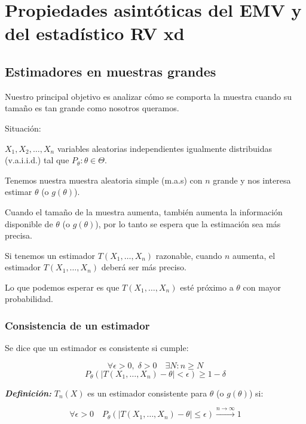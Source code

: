 \section{Propiedades asintóticas del EMV y del estadístico RV xd}


\subsection{Estimadores en muestras grandes}

Nuestro principal objetivo es analizar cómo se comporta la muestra cuando su tamaño es tan grande como nosotros queramos.
\setlength{\parskip}{1em}   %

Situación:
\setlength{\parskip}{0em}   %

$ X_1, X_2, \dots, X_n $ variables aleatorias independientes igualmente distribuidas (v.a.i.i.d.) tal que $ P_\theta:\theta  \in  \Theta$.

Tenemos nuestra muestra aleatoria simple (m.a.s) con $ n $ grande y nos interesa estimar $ \theta $ (o $ g(\theta) $).

\setlength{\parskip}{1em}   %
Cuando el tamaño de la muestra aumenta, también aumenta la información disponible de $ \theta $ (o $ g(\theta) $), por lo tanto se espera que la estimación sea más precisa.

Si tenemos un estimador $ T(X_1, \dots, X_n) $ razonable, cuando $ n $ aumenta, el estimador $ T(X_1, \dots, X_n) $ deberá ser más preciso.

\setlength{\parskip}{0em}   %
Lo que podemos esperar es que $ T(X_1, \dots, X_n) $ esté próximo a $ \theta $ con mayor probabilidad.

\subsubsection{Consistencia de un estimador}

Se dice que un estimador es consistente si cumple:
\setlength{\parskip}{1em}

\[\forall \epsilon > 0, \; \delta > 0 \quad \exists N: n \geq N\]
\[P_\theta\left(|T(X_1, \dots, X_n) - \theta| < \epsilon\right) \geq 1 - \delta\]

\textbf{\textit{Definición: }} $T_n(X)$ es un estimador consistente para $\theta$ (o $g(\theta)$) si:

\[
    \forall \epsilon > 0 \quad P_\theta\left(|T(X_1, \dots, X_n) - \theta| \leq \epsilon\right) \xrightarrow{n \to \infty} 1
\]


